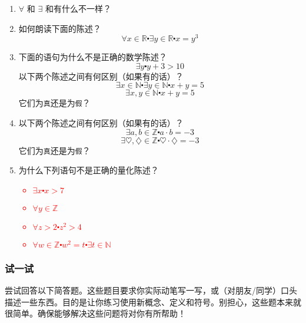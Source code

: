 \begin{enumerate}[label=(\arabic*)]
    \item $\forall$ 和 $\exists$ 和有什么不一样？
    \item 如何朗读下面的陈述？
        \[\forall x \in \mathbb{R} \centerdot \exists y \in \mathbb{R} \centerdot x = y^3\]
    \item 下面的语句为什么不是正确的数学陈述？
        \[\exists y \centerdot y + 3 > 10\]
        以下两个陈述之间有何区别（如果有的话）？
        \[\exists x \in \mathbb{N} \centerdot ∃y \in \mathbb{N} \centerdot x + y = 5\]
        \[\exists x, y \in \mathbb{N} \centerdot x + y = 5\]
        它们为\verb|真|还是为\verb|假|？
    \item 以下两个陈述之间有何区别（如果有的话）？
        \[\exists a, b \in \mathbb{Z} \centerdot a \cdot b = -3\]
        \[\exists \heartsuit, \diamondsuit \in \mathbb{Z} \centerdot \heartsuit \cdot \diamondsuit = -3\]
        它们为\verb|真|还是为\verb|假|？
    \item 为什么下列语句不是正确的量化陈述？
        \textcolor{red}{\begin{itemize}
            \item $\exists x \centerdot x > 7$
            \item $\forall y \in \mathbb{Z}$
            \item $\forall z > 2 \centerdot z^2 > 4$
            \item $\forall w \in \mathbb{Z} \centerdot w^2 = t \centerdot \exists t \in \mathbb{N}$
        \end{itemize}}
\end{enumerate}

\subsubsection*{试一试}

尝试回答以下简答题。这些题目要求你实际动笔写一写，或（对朋友/同学）口头描述一些东西。目的是让你练习使用新概念、定义和符号。别担心，这些题本来就很简单。确保能够解决这些问题将对你有所帮助！

